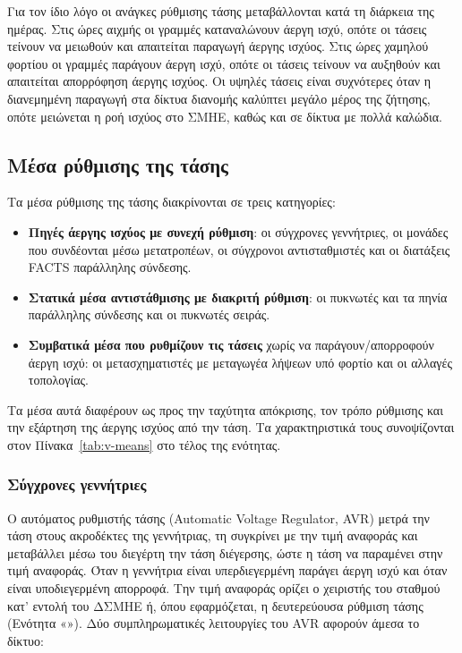 Για τον ίδιο λόγο οι ανάγκες ρύθμισης τάσης μεταβάλλονται κατά τη διάρκεια της ημέρας. Στις
ώρες αιχμής οι γραμμές καταναλώνουν άεργη ισχύ, οπότε οι τάσεις τείνουν να μειωθούν και
απαιτείται παραγωγή άεργης ισχύος. Στις ώρες χαμηλού φορτίου οι γραμμές παράγουν άεργη ισχύ,
οπότε οι τάσεις τείνουν να αυξηθούν και απαιτείται απορρόφηση άεργης ισχύος. Οι υψηλές τάσεις
είναι συχνότερες όταν η διανεμημένη παραγωγή στα δίκτυα διανομής καλύπτει μεγάλο μέρος της
ζήτησης, οπότε μειώνεται η ροή ισχύος στο ΣΜΗΕ, καθώς και σε δίκτυα με πολλά καλώδια.

\subsection{Μέσα ρύθμισης της τάσης}
\label{sec:q-sources}

Τα μέσα ρύθμισης της τάσης διακρίνονται σε τρεις κατηγορίες:

\begin{itemize}
\item \textbf{Πηγές άεργης ισχύος με συνεχή ρύθμιση}: οι σύγχρονες γεννήτριες, οι μονάδες που
      συνδέονται μέσω μετατροπέων, οι σύγχρονοι αντισταθμιστές και οι διατάξεις FACTS
      παράλληλης σύνδεσης.
\item \textbf{Στατικά μέσα αντιστάθμισης με διακριτή ρύθμιση}: οι πυκνωτές και τα πηνία
      παράλληλης σύνδεσης και οι πυκνωτές σειράς.
\item \textbf{Συμβατικά μέσα που ρυθμίζουν τις τάσεις} χωρίς να παράγουν/απορροφούν άεργη ισχύ: οι
      μετασχηματιστές με μεταγωγέα λήψεων υπό φορτίο και οι αλλαγές τοπολογίας.
\end{itemize}

Τα μέσα αυτά διαφέρουν ως προς την ταχύτητα απόκρισης, τον τρόπο ρύθμισης και την εξάρτηση
της άεργης ισχύος από την τάση. Τα χαρακτηριστικά τους συνοψίζονται στον
Πίνακα~\ref{tab:v-means} στο τέλος της ενότητας.

\subsubsection{Σύγχρονες γεννήτριες}
\label{sec:sg}

Ο αυτόματος ρυθμιστής τάσης (Automatic Voltage Regulator, AVR) μετρά την τάση στους
ακροδέκτες της γεννήτριας, τη συγκρίνει με την τιμή αναφοράς και μεταβάλλει μέσω του διεγέρτη
την τάση διέγερσης, ώστε η τάση να παραμένει στην τιμή αναφοράς. Όταν η γεννήτρια είναι
υπερδιεγερμένη παράγει άεργη ισχύ και όταν είναι υποδιεγερμένη απορροφά. Την τιμή αναφοράς
ορίζει ο χειριστής του σταθμού κατ' εντολή του ΔΣΜΗΕ ή, όπου εφαρμόζεται, η δευτερεύουσα
ρύθμιση τάσης (Ενότητα «»). Δύο συμπληρωματικές λειτουργίες του AVR
αφορούν άμεσα το δίκτυο:

